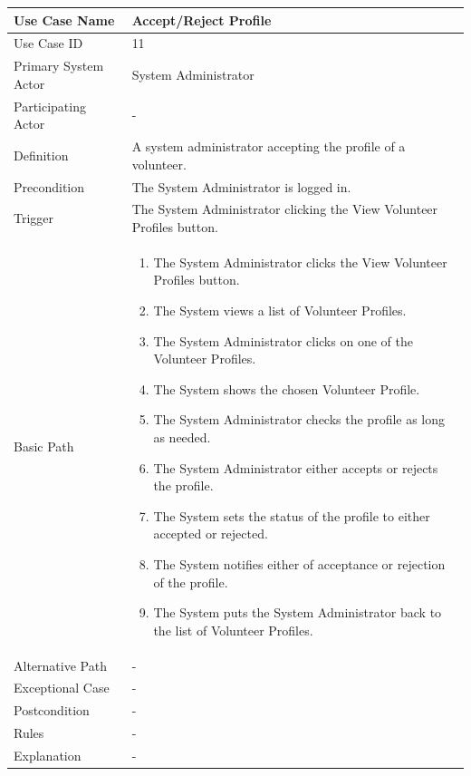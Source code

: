 \documentclass[a4paper,12pt]{report}
\begin{document}
		\begin{tabular}{|m{4cm}|m{11.5cm}|}
			\hline
				Use Case Name & Accept/Reject Profile\\
			\hline
				Use Case ID & 11\\
			\hline
				Primary System Actor & System Administrator\\
			\hline
				Participating Actor & -\\
			\hline
				Definition & A system administrator accepting the profile of a volunteer.\\
			\hline
				Precondition & The System Administrator is logged in.\\
			\hline
				Trigger & The System Administrator clicking the View Volunteer Profiles button.\\
			\hline
				Basic Path & \begin{enumerate}
					\item The System Administrator clicks the View Volunteer Profiles button.
					\item The System views a list of Volunteer Profiles.
					\item The System Administrator clicks on one of the Volunteer Profiles.
					\item The System shows the chosen Volunteer Profile.
					\item The System Administrator checks the profile as long as needed.
					\item The System Administrator either accepts or rejects the profile.
					\item The System sets the status of the profile to either accepted or rejected.
					\item The System notifies either of acceptance or rejection of the profile.
					\item The System puts the System Administrator back to the list of Volunteer Profiles.
				\end{enumerate}		
				\\
			\hline
				Alternative Path & -\\
			\hline
				Exceptional Case & -\\
			\hline
				Postcondition & -\\
			\hline
				Rules & -\\
			\hline
				Explanation & -\\
			\hline
		\end{tabular}
\end{document}
